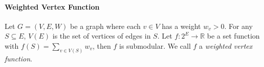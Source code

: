 \documentclass[11pt]{article}
\newcommand{\bbR}{\mathbb{R}}
\newcommand{\calK}{\mathcal{K}}
\DeclareMathOperator*{\argmax}{arg\,max}
\begin{document}
\paragraph{Weighted Vertex Function}
Let $G = (V, E, W)$ be a graph where each $v\in V$ has a weight $w_v > 0$. For any $S \subseteq E$, $V(E)$ is the set of vertices of edges in $S$. Let $f: 2^E \rightarrow \bbR$ be a set function with $f(S) =\sum_{v\in V(S)} w_{v}$, then $f$ is submodular. We call $f$ a \emph{weighted vertex function}.






\end{document}

